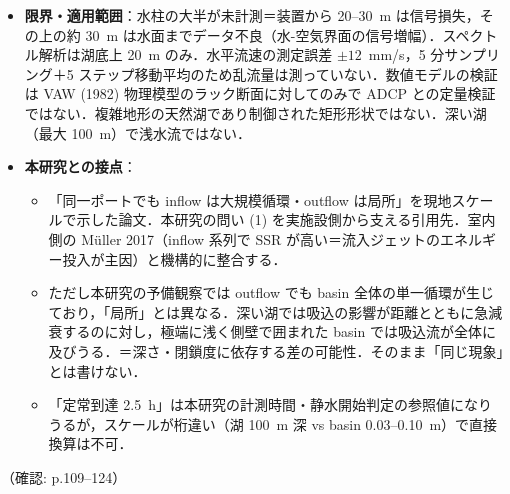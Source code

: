 \documentclass[11pt]{jsarticle}
\begin{document}
\begin{itemize}
\begin{itemize}
  \end{itemize}
  \item \textbf{限界・適用範囲}：水柱の大半が未計測＝装置から 20--30~m は信号損失，その上の約 30~m は水面までデータ不良（水-空気界面の信号増幅）．スペクトル解析は湖底上 20~m のみ．水平流速の測定誤差 $\pm 12$~mm/s，5 分サンプリング＋5 ステップ移動平均のため乱流量は測っていない．数値モデルの検証は VAW (1982) 物理模型のラック断面に対してのみで ADCP との定量検証ではない．複雑地形の天然湖であり制御された矩形形状ではない．深い湖（最大 100~m）で浅水流ではない．
  \item \textbf{本研究との接点}：
  \begin{itemize}
    \item 「同一ポートでも inflow は大規模循環・outflow は局所」を現地スケールで示した論文．本研究の問い (1) を実施設側から支える引用先．室内側の M\"uller 2017（inflow 系列で SSR が高い＝流入ジェットのエネルギー投入が主因）と機構的に整合する．
    \item ただし本研究の予備観察では outflow でも basin 全体の単一循環が生じており，「局所」とは異なる．深い湖では吸込の影響が距離とともに急減衰するのに対し，極端に浅く側壁で囲まれた basin では吸込流が全体に及びうる．＝深さ・閉鎖度に依存する差の可能性．そのまま「同じ現象」とは書けない．
    \item 「定常到達 2.5~h」は本研究の計測時間・静水開始判定の参照値になりうるが，スケールが桁違い（湖 100~m 深 vs basin 0.03--0.10~m）で直接換算は不可．
  \end{itemize}
\end{itemize}
\noindent（確認: p.109--124）
\end{document}
